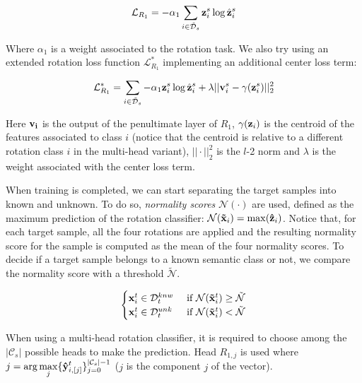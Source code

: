 \documentclass[10pt,twocolumn,letterpaper]{article}
\begin{document}
\begin{equation}
  \mathcal{L}_{R_1} = -\alpha_1\sum_{i\in\mathcal{\tilde{D}}_s} {\bf z}_i^s \log \hat{{\bf z}}_i^s
  \label{eq:baseloss_rot}
\end{equation}

Where $\alpha_1$ is a weight associated to the rotation task.
We also try using an extended rotation loss function $\mathcal{L}_{R_1}^*$ implementing an additional center loss\cite{CenterLoss} term:

\begin{equation}
  \mathcal{L}_{R_1}^* = \sum_{i\in\mathcal{\tilde{D}}_s} -\alpha_1{\bf z}_i^s \log \hat{{\bf z}}_i^s+\lambda||{\bf v}_i^s-\gamma({\bf z}_i^s)||_2^2
  \label{eq:center_loss}
\end{equation}

Here ${\bf v_i}$ is the output of the penultimate layer of $R_1$,
$\gamma({\bf z}_i)$ is the centroid of the features associated to class $i$
(notice that the centroid is relative to a different rotation class $i$ in the multi-head variant),
$||\cdot||_2^2$ is the $l$-2 norm and $\lambda$ is the weight associated with the center loss term.

When training is completed, 
we can start separating the target samples into known and unknown.
To do so,
{\it normality scores} $\mathcal{N}(\cdot)$ are used,
defined as the maximum prediction of the rotation classifier:
$\mathcal{N}({\bf\tilde{x}}_i) = \max({\bf\hat{z}}_i)$.
Notice that, for each target sample, all the four rotations are applied and the resulting normality score for the sample
is computed as the mean of the four normality scores.
To decide if a target sample belongs to a known semantic class or not, we compare the normality score with a threshold $\tilde{\mathcal{N}}$.

\begin{equation}
  \begin{cases}
    {\bf x}_i^t \in \mathcal{D}_t^{knw} & \text{ if } \mathcal{N}({\bf\tilde x}_i^t) \geq \tilde{\mathcal{N}} \\
    {\bf x}_i^t \in \mathcal{D}_t^{unk} & \text{ if } \mathcal{N}({\bf\tilde x}_i^t) < \tilde{\mathcal{N}}
  \end{cases}
  \label{eq:sample_separation}
\end{equation}

When using a multi-head rotation classifier, 
it is required to choose among the $|\mathcal{C}_s|$ possible heads to make the prediction.
Head $R_{1,j}$ is used where $\displaystyle j = \arg\max_j \{{\bf\hat{y}}_{i, [j]}^t\}_{j=0}^{|\mathcal{C}_s|-1}$
($j$ is the component $j$ of the vector).
\end{document}
